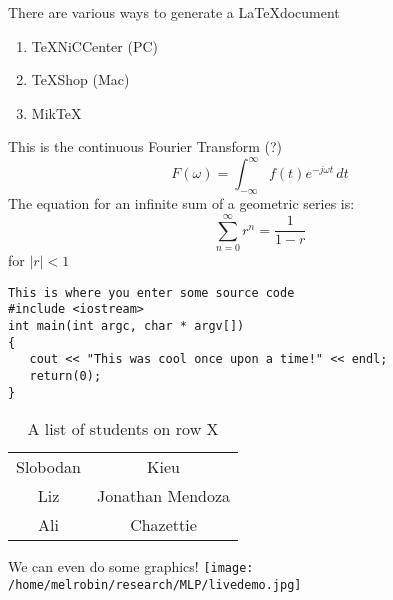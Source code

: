 \documentclass{article}
\begin{document}
There are various ways to generate a \LaTeX document
\begin{enumerate}
\item TeXNiCCenter (PC)
\item TeXShop (Mac)
\item MikTeX
\end{enumerate}
This is the continuous Fourier Transform (?)
\begin{equation*}
F(\omega)=\int_{-\infty}^{\infty} f(t)e^{-j\omega t}\,dt
\end{equation*}
The equation for an infinite sum of a geometric series is:
\begin{equation*}
\sum_{n=0}^\infty r^n=\frac{1}{1-r}
\end{equation*}
for $|r|<1$

\begin{verbatim}
This is where you enter some source code
#include <iostream>
int main(int argc, char * argv[])
{
   cout << "This was cool once upon a time!" << endl;
   return(0);
}
\end{verbatim}
\begin{table}
\begin{tabular}{cc}
\toprule
\midrule
Slobodan &Kieu\\
Liz & Jonathan Mendoza\\
Ali & Chazettie\\
\bottomrule
\end{tabular}
\caption{A list of students on row X}
\end{table}
We can even do some graphics!
\texttt{[image: /home/melrobin/research/MLP/livedemo.jpg]}
\end{document}
